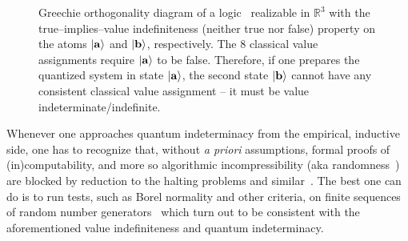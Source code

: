 \documentclass[runningheads]{llncs}
\begin{document}
\begin{figure}[h]
\begin{center}
\end{center}
\caption{Greechie orthogonality diagram of a logic~\cite[Fig.~2, p.~102201-8]{2015-AnalyticKS}
realizable in $\mathbb{R}^3$
with the true--implies--value indefiniteness (neither true nor false) property on the atoms $\vert {\bf a} \rangle $ and $\vert {\bf b} \rangle $,
respectively.
The 8 classical value assignments require $\vert {\bf a} \rangle $ to be false.
Therefore, if  one prepares the quantized system in state $\vert {\bf a} \rangle $,
the second state $\vert {\bf b} \rangle $ cannot have any consistent classical value assignment -- it must be value indeterminate/indefinite.
}
\label{2019-s}
\end{figure}

Whenever one approaches quantum indeterminacy from the empirical, inductive side,
one has to recognize that, without {\it a priori} assumptions, formal proofs of (in)computability,
and more so algorithmic incompressibility (aka randomness~\cite{ml:70})
are blocked by reduction to the halting problems and similar~\cite{svozil-2016-pu-book}.
The best one can do is to run
tests, such as Borel normality and other criteria, on finite sequences of random number generators~\cite{PhysRevA.82.022102,Abbott_2019}
which turn out to be consistent with the aforementioned value indefiniteness and
quantum indeterminacy.
\end{document}

